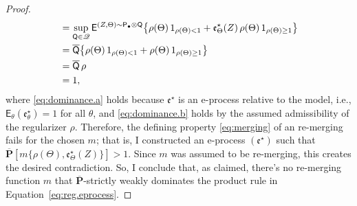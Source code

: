 \documentclass[10pt,a4paper]{amsart}
\newcommand{\E}{\mathsf{E}}
\newcommand{\credal}{\mathscr{Q}}
\newcommand{\eval}{\mathfrak{e}}
\newcommand{\prior}{\mathsf{Q}}
\newcommand{\prob}{\mathsf{P}}
\newcommand{\uprior}{\overline{\mathsf{Q}}}
\newcommand{\uuprob}{\mathbf{\overline{P}}}
\begin{document}
\begin{proof}
\begin{align}
& = \sup_{\prior \in \credal} \E^{(Z,\Theta) \sim \prob_\bullet \otimes \prior} \bigl\{ \rho(\Theta) \, 1_{\rho(\Theta) < 1} + \eval_\Theta^\star(Z) \, \rho(\Theta) \, 1_{\rho(\Theta) \geq 1} \bigr\} \notag \\
& = \uprior\bigl\{ \rho(\Theta) \, 1_{\rho(\Theta) < 1} + \rho(\Theta) \, 1_{\rho(\Theta) \geq 1} \bigr\} \label{eq:dominance.a} \\
& = \uprior\,\rho \notag \\
& = 1, \label{eq:dominance.b}
\end{align}
where \eqref{eq:dominance.a} holds because $\eval^\star$ is an e-process relative to the model, i.e., $\E_\theta(\eval_\theta^\star) = 1$ for all $\theta$, and \eqref{eq:dominance.b} holds by the assumed admissibility of the regularizer $\rho$.  Therefore, the defining property \eqref{eq:merging} of an re-merging fails for the chosen $m$; that is, I constructed an e-process $(\eval^\star)$ such that $\uuprob[ m\{ \rho(\Theta), \eval_\Theta^\star(Z) \} ] > 1$.  Since $m$ was assumed to be re-merging, this creates the desired contradiction.  So, I conclude that, as claimed, there's no re-merging function $m$ that $\uuprob$-strictly weakly dominates the product rule in Equation~\eqref{eq:reg.eprocess}.  
\end{proof}
\end{document}

